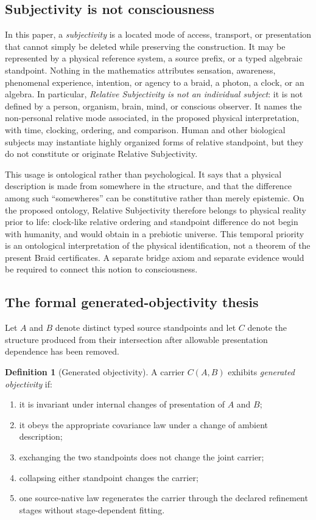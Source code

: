 \documentclass[11pt]{article}
\theoremstyle{definition}
\newtheorem{definition}[theorem]{Definition}
\theoremstyle{remark}
\begin{document}
\subsection{Subjectivity is not consciousness}

In this paper, a \emph{subjectivity} is a located mode of access, transport, or presentation that cannot simply be deleted while preserving the construction. It may be represented by a physical reference system, a source prefix, or a typed algebraic standpoint. Nothing in the mathematics attributes sensation, awareness, phenomenal experience, intention, or agency to a braid, a photon, a clock, or an algebra. In particular, \emph{Relative Subjectivity is not an individual subject}: it is not defined by a person, organism, brain, mind, or conscious observer. It names the non-personal relative mode associated, in the proposed physical interpretation, with time, clocking, ordering, and comparison. Human and other biological subjects may instantiate highly organized forms of relative standpoint, but they do not constitute or originate Relative Subjectivity.

This usage is ontological rather than psychological. It says that a physical description is made from somewhere in the structure, and that the difference among such ``somewheres'' can be constitutive rather than merely epistemic. On the proposed ontology, Relative Subjectivity therefore belongs to physical reality prior to life: clock-like relative ordering and standpoint difference do not begin with humanity, and would obtain in a prebiotic universe. This temporal priority is an ontological interpretation of the physical identification, not a theorem of the present Braid certificates. A separate bridge axiom and separate evidence would be required to connect this notion to consciousness.

\subsection{The formal generated-objectivity thesis}

Let $A$ and $B$ denote distinct typed source standpoints and let $C$ denote the structure produced from their intersection after allowable presentation dependence has been removed.

\begin{definition}[Generated objectivity]\label{def:go}
A carrier $C(A,B)$ exhibits \emph{generated objectivity} if:
\begin{enumerate}
\item it is invariant under internal changes of presentation of $A$ and $B$;
\item it obeys the appropriate covariance law under a change of ambient description;
\item exchanging the two standpoints does not change the joint carrier;
\item collapsing either standpoint changes the carrier;
\item one source-native law regenerates the carrier through the declared refinement stages without stage-dependent fitting.
\end{enumerate}
\end{definition}
\end{document}
